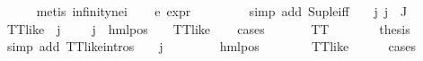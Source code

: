 \begin{isabellebody}
\ \ \ \ \isamarkupfalse%
\ {\isacharparenleft}{\kern0pt}metis\ infinity{\isacharunderscore}{\kern0pt}ne{\isacharunderscore}{\kern0pt}i{}{\isacharparenright}{\kern0pt}\isanewline
\ \ \isamarkupfalse%
\ e{}{\isacharunderscore}{\kern0pt}{\isasympsi}{\isacharcolon}{\kern0pt}\ {\isachardoublequoteopen}expr{\isacharunderscore}{\kern0pt}{}\ {\isasympsi}\ {\isasymle}\ {}{\isachardoublequoteclose}\isanewline
\ \ \ \ \isamarkupfalse%
\ {\isacharparenleft}{\kern0pt}simp\ add{\isacharcolon}{\kern0pt}\ Sup{\isacharunderscore}{\kern0pt}le{\isacharunderscore}{\kern0pt}iff\ {\isacartoucheopen}{\isasympsi}\ {\isacharequal}{\kern0pt}\ {\isasymPhi}\ j{\isacartoucheclose}\ {\isacartoucheopen}j\ {\isasymin}\ J{\isacartoucheclose}{\isacharparenright}{\kern0pt}\isanewline
\ \ \isamarkupfalse%
\ {\isachardoublequoteopen}TT{\isacharunderscore}{\kern0pt}like\ {\isacharparenleft}{\kern0pt}{\isasymPhi}\ j{\isacharparenright}{\kern0pt}\ {\isasymor}\ {\isacharparenleft}{\kern0pt}{\isasymexists}{\isasymalpha}\ {\isasymchi}{\isachardot}{\kern0pt}\ {\isasymPhi}\ j\ {\isacharequal}{\kern0pt}\ hml{\isacharunderscore}{\kern0pt}pos\ {\isasymalpha}\ {\isasymchi}\ {\isasymand}\ TT{\isacharunderscore}{\kern0pt}like\ {\isasymchi}{\isacharparenright}{\kern0pt}{\isachardoublequoteclose}\isanewline
\ \ \isamarkupfalse%
{\isacharparenleft}{\kern0pt}cases\ {\isasympsi}{\isacharparenright}{\kern0pt}\isanewline
\ \ \ \ \isamarkupfalse%
\ TT\isanewline
\ \ \ \ \isamarkupfalse%
\ \isamarkupfalse%
\ {\isacharquery}{\kern0pt}thesis\isanewline
\ \ \ \ \ \ \isamarkupfalse%
\ {\isacharparenleft}{\kern0pt}simp\ add{\isacharcolon}{\kern0pt}\ TT{\isacharunderscore}{\kern0pt}like{\isachardot}{\kern0pt}intros{\isacharparenleft}{\kern0pt}{}{\isacharparenright}{\kern0pt}\ {\isacartoucheopen}{\isasympsi}\ {\isacharequal}{\kern0pt}\ {\isasymPhi}\ j{\isacartoucheclose}{\isacharparenright}{\kern0pt}\isanewline
\ \ \isamarkupfalse%
\isanewline
\ \ \ \ \isamarkupfalse%
\ {\isacharparenleft}{\kern0pt}hml{\isacharunderscore}{\kern0pt}pos\ {\isasymalpha}\ {\isasymchi}{\isacharparenright}{\kern0pt}\isanewline
\ \ \ \ \isamarkupfalse%
\ {\isachardoublequoteopen}TT{\isacharunderscore}{\kern0pt}like\ {\isasymchi}{\isachardoublequoteclose}\isanewline
\ \ \ \ \isamarkupfalse%
{\isacharparenleft}{\kern0pt}cases\ {\isasymchi}{\isacharparenright}{\kern0pt}\isanewline

\end{isabellebody}
